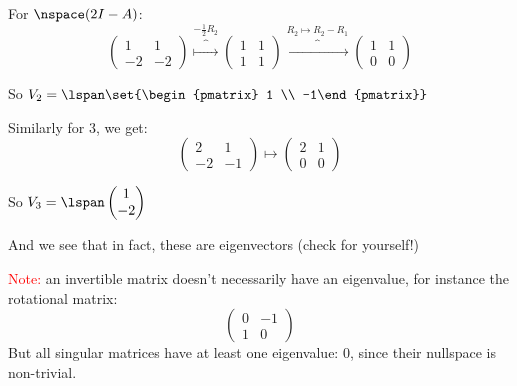 \documentclass[10pt]{article}
\begin{document}
For $\nspace(2I-A)$:
\[ \begin{pmatrix} 1 & 1 \\ -2 & -2 \end{pmatrix} \overbrace{\longmapsto}^{-\frac{1}{2}R_2} \begin{pmatrix} 1 & 1 \\ 1 & 1 \end{pmatrix} \overbrace{\longmapsto}^{R_2\mapsto R_2-R_1} \begin{pmatrix} 1 & 1 \\ 0 & 0 \end{pmatrix} \]

So $V_2 = \lspan\set{\begin{pmatrix} 1 \\ -1\end{pmatrix}}$

Similarly for $3$, we get:
\[ \begin{pmatrix} 2 & 1 \\ -2 & -1\end{pmatrix} \longmapsto \begin{pmatrix} 2 & 1 \\ 0 & 0 \end{pmatrix} \]

So $V_3 = \lspan\begin{pmatrix} 1 \\ -2 \end{pmatrix}$

And we see that in fact, these are eigenvectors (check for yourself!)

\medskip

\noindent\textcolor{red}{Note:} an invertible matrix doesn't necessarily have an eigenvalue, for instance the rotational matrix:
\[ \begin{pmatrix} 0 & -1 \\ 1 & 0 \end{pmatrix} \]
But all singular matrices have at least one eigenvalue: 0, since their nullspace is non-trivial.
\end{document}
